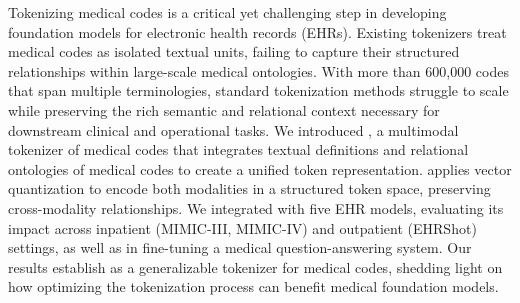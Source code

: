
Tokenizing medical codes is a critical yet challenging step in developing foundation models for electronic health records (EHRs). Existing tokenizers treat medical codes as isolated textual units, failing to capture their structured relationships within large-scale medical ontologies. With more than 600,000 codes that span multiple terminologies, standard tokenization methods struggle to scale while preserving the rich semantic and relational context necessary for downstream clinical and operational tasks.  
%
We introduced \model, a multimodal tokenizer of medical codes that integrates textual definitions and relational ontologies of medical codes to create a unified token representation. \model applies vector quantization to encode both modalities in a structured token space, preserving cross-modality relationships. We integrated \model with five EHR models, evaluating its impact across inpatient (MIMIC-III, MIMIC-IV) and outpatient (EHRShot) settings, as well as in fine-tuning a medical question-answering system.
%
Our results establish \model as a generalizable tokenizer for medical codes, shedding light on how optimizing the tokenization process can benefit medical foundation models.